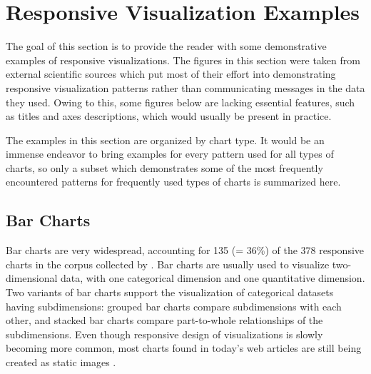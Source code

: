 \section{Responsive Visualization Examples}


The goal of this section is to provide the reader with some
demonstrative examples of responsive visualizations.  The figures in
this section were taken from external scientific sources which put
most of their effort into demonstrating responsive visualization
patterns rather than communicating messages in the data they used.
Owing to this, some figures below are lacking essential features, such
as titles and axes descriptions, which would usually be present in
practice.


The examples in this section are organized by chart type. It would be
an immense endeavor to bring examples for every pattern used for all
types of charts, so only a subset which demonstrates some of the most
frequently encountered patterns for frequently used types of charts is
summarized here.













\subsection{Bar Charts}

Bar charts are very widespread, accounting for 135 (= 36\%) of the 378
responsive charts in the corpus collected by
\textcite{DesignPatternsTradeOffsRespVis}. Bar charts are usually used
to visualize two-dimensional data, with one categorical dimension and
one quantitative dimension. Two variants of bar charts support the
visualization of categorical datasets having subdimensions: grouped
bar charts \parencite{GroupedBar} compare subdimensions with each
other, and stacked bar charts \parencite{StackedBar} compare
part-to-whole relationships of the subdimensions. Even though
responsive design of visualizations is slowly becoming more common,
most charts found in today's web articles are still being created as
static images \parencite{HBar,VBar,HVBar,MapBarLine}.


